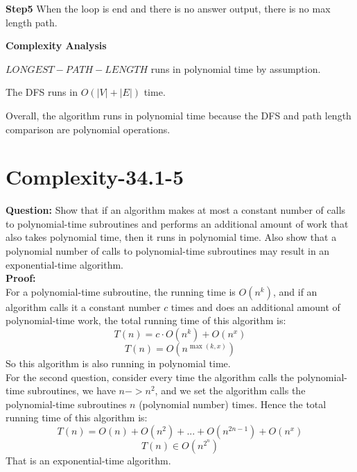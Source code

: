 \documentclass[12pt]{article}
\begin{document}
\textbf{Step5} When the loop is end and there is no answer output, there is no max length path.

\textbf{Complexity Analysis}

 $LONGEST-PATH-LENGTH$ runs in polynomial time by assumption.

The DFS runs in $O(|V| + |E|)$ time.

Overall, the algorithm runs in polynomial time because the DFS and path length comparison are polynomial operations.



\section{Complexity-34.1-5}
\textbf{Question:} Show that if an algorithm makes at most a constant number of calls to polynomial-time subroutines and performs an additional amount of work that also takes polynomial time, then it runs in polynomial time. Also show that a polynomial number of
calls to polynomial-time subroutines may result in an exponential-time algorithm.\\
\textbf{Proof:}\\
For a polynomial-time subroutine, the running time is \(O(n^k)\), and if an algorithm calls it a constant number \(c\) times and does an additional amount of polynomial-time work, the total running time of this algorithm is:
\[T(n) = c \cdot O(n^k) + O(n^x)\]
\[T(n) = O(n^{\max(k,x)}) \]
So this algorithm is also running in polynomial time. \\
For the second question, consider every time the algorithm calls the polynomial-time subroutines, we have \(n->n^2\), and we set the algorithm calls the polynomial-time subroutines \(n\) (polynomial number) times.
Hence the total running time of this algorithm is:
\[T(n) = O(n) + O(n^2) + ...+O(n^{2n-1}) + O(n^x) \]
\[T(n) \in O(n^{2^n})\]
That is an exponential-time algorithm.
\end{document}
